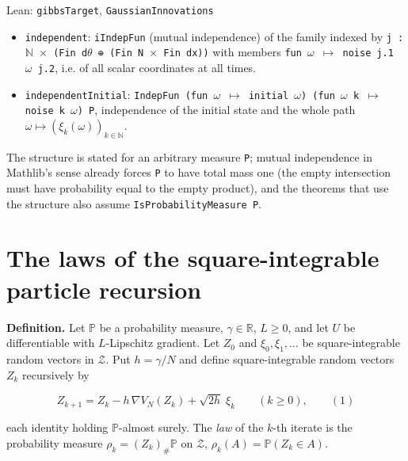 \documentclass[11pt,a4paper]{article}
\begin{document}
\begin{leanbox}{Lean: \texttt{gibbsTarget}, \texttt{GaussianInnovations}}
\begin{enumerate}
\begin{itemize}
\item \texttt{independent}: \texttt{i\allowbreak{}Indep\allowbreak{}Fun} (mutual independence) of the family indexed by \texttt{j : \ensuremath{\mathbb N} \ensuremath{\times} (Fin d\ensuremath{\theta} ⊕ (Fin N \ensuremath{\times} Fin dx))} with members \texttt{fun \ensuremath{\omega} \ensuremath{\mapsto} noise j.\allowbreak{}1 \ensuremath{\omega} j.\allowbreak{}2}, i.e. of all scalar coordinates at all times.

\item \texttt{independent\allowbreak{}Initial}: \texttt{Indep\allowbreak{}Fun (fun \ensuremath{\omega} \ensuremath{\mapsto} initial \ensuremath{\omega}) (fun \ensuremath{\omega} k \ensuremath{\mapsto} noise k \ensuremath{\omega}) P}, independence of the initial state and the whole path \(\omega\mapsto(\xi_k(\omega))_{k\in\mathbb N}\).

\end{itemize}

The structure is stated for an arbitrary measure \texttt{P}; mutual independence in Mathlib's sense already forces \texttt{P} to have total mass one (the empty intersection must have probability equal to the empty product), and the theorems that use the structure also assume \texttt{Is\allowbreak{}Probability\allowbreak{}Measure P}.

\end{enumerate}
\end{leanbox}

\section{\texorpdfstring{The laws of the square-integrable particle recursion}{The laws of the square-integrable particle recursion}}


\textbf{Definition.} Let \(\mathbb P\) be a probability measure, \(\gamma\in\mathbb R\), \(L\ge0\), and let \(U\) be differentiable with \(L\)-Lipschitz gradient. Let \(Z_0\) and \(\xi_0,\xi_1,\dots\) be square-integrable random vectors in \(\mathcal Z\). Put \(h=\gamma/N\) and define square-integrable random vectors \(Z_k\) recursively by


\[Z_{k+1}=Z_k-h\,\nabla V_N(Z_k)+\sqrt{2h}\;\xi_k\qquad(k\ge0),\qquad(1)\]


each identity holding \(\mathbb P\)-almost surely. The \emph{law} of the \(k\)-th iterate is the probability measure \(\rho_k=(Z_k)_\#\mathbb P\) on \(\mathcal Z\), \(\rho_k(A)=\mathbb P(Z_k\in A)\).
\end{document}
